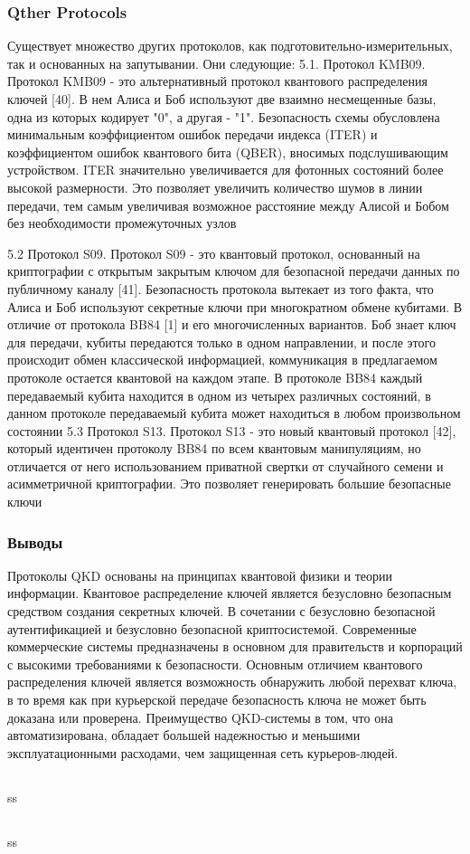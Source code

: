 \subsubsection{Qther Protocols}

Существует множество других протоколов, как подготовительно-измерительных, так и основанных на запутывании. Они следующие:
5.1. Протокол KMB09. Протокол KMB09 - это альтернативный протокол квантового распределения ключей [40]. В нем Алиса и Боб используют две взаимно несмещенные базы, одна из которых кодирует "0", а другая - "1". Безопасность схемы обусловлена минимальным коэффициентом ошибок передачи индекса (ITER) и коэффициентом ошибок квантового бита (QBER), вносимых подслушивающим устройством.
ITER значительно увеличивается для фотонных состояний более высокой размерности. Это позволяет увеличить количество шумов в линии передачи, тем самым увеличивая возможное расстояние между Алисой и Бобом без необходимости промежуточных узлов

5.2 Протокол S09. Протокол S09 - это квантовый протокол, основанный на криптографии с открытым закрытым ключом для безопасной передачи данных по публичному каналу [41]. Безопасность протокола вытекает из того факта, что Алиса и Боб используют секретные ключи при многократном обмене кубитами. В отличие от протокола BB84 [1] и его многочисленных вариантов. Боб знает ключ для передачи, кубиты передаются только в одном направлении, и после этого происходит обмен классической информацией, коммуникация в предлагаемом протоколе остается квантовой на каждом этапе. В протоколе BB84 каждый передаваемый кубита находится в одном из четырех различных состояний, в данном протоколе передаваемый кубита может находиться в любом произвольном состоянии
5.3 Протокол S13. Протокол S13 - это новый квантовый протокол [42], который идентичен протоколу BB84 по всем квантовым манипуляциям, но отличается от него использованием приватной свертки от случайного семени и асимметричной криптографии. Это позволяет генерировать большие безопасные ключи

\subsubsection{Выводы}
Протоколы QKD основаны на принципах квантовой физики и теории информации. Квантовое распределение ключей является безусловно безопасным средством создания секретных ключей. В сочетании с безусловно безопасной аутентификацией и безусловно безопасной криптосистемой.
Современные коммерческие системы предназначены в основном для правительств и корпораций с высокими требованиями к безопасности. Основным отличием квантового распределения ключей является возможность обнаружить любой перехват ключа, в то время как при курьерской передаче безопасность ключа не может быть доказана или проверена. Преимущество QKD-системы в том, что она автоматизирована, обладает большей надежностью и меньшими эксплуатационными расходами, чем защищенная сеть курьеров-людей.
\subsection{\review}
ss
\subsection{\dic}
ss